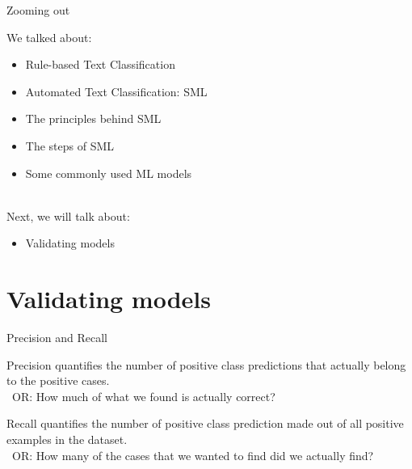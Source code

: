 \documentclass[handout]{beamer}
\begin{document}
\begin{frame}{Zooming out} 
	
	We talked about:
	\begin{itemize}
		\item Rule-based Text Classification
		\item Automated Text Classification: SML
		\item The principles behind SML
		\item The steps of SML
		\item Some commonly used ML models \\\
	\end{itemize}
	
	Next, we will talk about:
	\begin{itemize}
		\item Validating models
	\end{itemize}
	
\end{frame}


\section{Validating models}


\begin{frame}{Precision and Recall}
	
	Precision quantifies the number of positive class predictions that actually belong to the positive cases. \\\ 
	OR: How much of what we found is actually correct?
	
	Recall quantifies the number of positive class prediction made out of all positive examples in the dataset. \\\
	OR: How many of the cases that we wanted to find did we actually find?
	
	
	
	
\end{frame}
\end{document}
